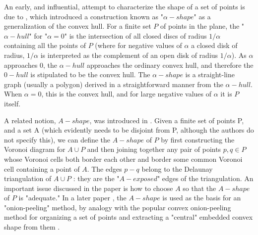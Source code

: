 \documentclass[preprint,5p,times,twocolumn]{elsarticle}
\begin{document}
An early, and influential, attempt to characterize the shape of a set of points is due to \cite{Edelsbrunner:2006:SSP:2263365.2270180}, which introduced a construction known as "$\alpha-shape$" as a generalization of the convex hull. For a finite set $P$ of points in the plane, the "$\alpha-hull$" for "$\alpha = 0$" is the intersection of all closed discs of radius $1/\alpha$ containing all the points of $P$ (where for negative values of $\alpha$ a closed disk of radius, $1/\alpha$ is interpreted as the complement of an open disk of radius $1/\alpha$). As $\alpha$ approaches 0, the $\alpha-hull$ approaches the ordinary convex hull, and therefore the $0-hull$ is stipulated to be the convex hull. The $\alpha-shape$ is a straight-line graph (usually a polygon) derived in a straightforward manner from the $\alpha-hull$. When $\alpha = 0$, this is the convex hull, and for large negative values of $\alpha$ it is $P$ itself.


A related notion, $A-shape$, was introduced in \cite{Melkemi:7693802}. Given a finite set of points P, and a set A (which evidently needs to be disjoint from P, although the authors do not specify this), we can define the $A-shape$ of $P$ by first constructing the Voronoi diagram for $A \cup P$ and then joining together any pair of points $p, q \in P$ whose Voronoi cells both border each other and border some common Voronoi cell containing a point of $A$. The edges $p-q$ belong to the Delaunay triangulation of $A \cup P$ : they are the "$A-exposed$" edges of the triangulation. An important
issue discussed in the paper is how to choose $A$ so that the $A-shape$ of $P$ is "adequate." In a later paper \cite{fadili:hal-01123869}, the $A-shape$ is used as the basis for an "onion-peeling" method, by analogy with the popular convex onion-peeling method for organizing a set of points and extracting a "central" embedded convex shape from them \cite{Chazelle1057060}.
\end{document}
